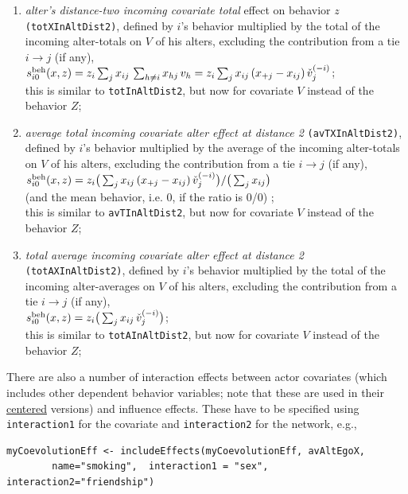 \documentclass[a4paper,fleqn,11pt]{article}
\newcommand{\+}{\, + \,}
\newcommand{\vit}{\theenumi}
\newcounter{savenumi}
\begin{document}
\begin{enumerate}
 \item {\em alter's distance-two incoming covariate total} effect on behavior $z$ \texttt{(totXInAltDist2)},
 defined by  $i$'s
 behavior multiplied by the total of the incoming alter-totals on $V$ of his alters,
 excluding the contribution from a tie $i \rightarrow j$ (if any),\\
 $s^{\rm beh}_{i\vit}(x, z) = z_i \sum_j x_{ij}\, \sum_{h \neq i} x_{hj}\,v_h =
         z_i \sum_j x_{ij}\, (x_{+j}- x_{ij}) \, \check v_j^{(-i)}  $;\\[0.5ex]
 this is similar to \texttt{totInAltDist2}, but now for covariate $V$
 instead of the behavior $Z$;

 \item {\em average total incoming covariate alter effect at distance 2} \texttt{(avTXInAltDist2)},
 defined by  $i$'s
 behavior multiplied by the average of the incoming alter-totals on $V$ of his alters,
 excluding the contribution from a tie $i \rightarrow j$ (if any),\\[0.3ex]
 $s^{\rm beh}_{i\vit}(x, z) =  z_i \big( \sum_j x_{ij}\,(x_{+j}- x_{ij}) \, \check v_j^{(-i)} \big)
                                / \big (\sum_j x_{ij}\big)  $\\[0.5ex]
 (and the mean behavior, i.e. $0$, if the ratio is 0/0) ;\\
 this is similar to \texttt{avTInAltDist2}, but now for covariate $V$
 instead of the behavior $Z$;

 \item {\em total average incoming covariate alter effect at distance 2} \texttt{(totAXInAltDist2)},
 defined by  $i$'s
 behavior multiplied by the total of the incoming alter-averages on $V$ of his alters,
 excluding the contribution from a tie $i \rightarrow j$ (if any), \\[0.3ex]
 $s^{\rm beh}_{i\vit}(x, z) =  z_i \big( \sum_j x_{ij}\, \check v_j^{(-i)} \big) $;\\[0.5ex]
 this is similar to \texttt{totAInAltDist2}, but now for covariate $V$
 instead of the behavior $Z$;

\setcounter{savenumi}{\value{enumi}}
\end{enumerate}
There are also a number of interaction effects between actor covariates
(which includes other dependent behavior variables; note that these are used
in their \underline{centered} versions) and influence effects.
These have to be specified using \texttt{interaction1} for the covariate
and \texttt{interaction2} for the network, e.g.,
\begin{verbatim}
myCoevolutionEff <- includeEffects(myCoevolutionEff, avAltEgoX,
        name="smoking",  interaction1 = "sex", interaction2="friendship")
\end{verbatim}
\end{document}
